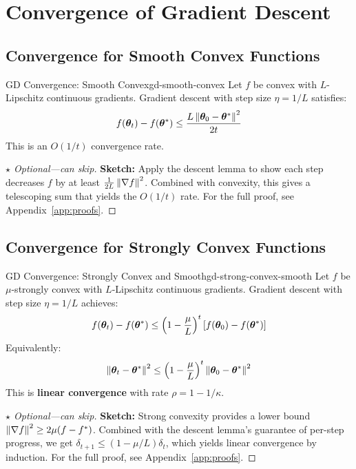 \documentclass[../../main.tex]{subfiles}
\begin{document}
\section{Convergence of Gradient Descent}
\label{sec:gd-convergence}

\subsection{Convergence for Smooth Convex Functions}

\begin{theorem}{GD Convergence: Smooth Convex}{gd-smooth-convex}
Let $f$ be convex with $L$-Lipschitz continuous gradients. Gradient descent with step size $\eta = 1/L$ satisfies:
\[
    f(\boldsymbol{\theta}_t) - f(\boldsymbol{\theta}^*) \leq \frac{L \left\lVert \boldsymbol{\theta}_0 - \boldsymbol{\theta}^* \right\rVert^2}{2t}
\]
This is an $O(1/t)$ convergence rate.
\end{theorem}

\begin{proof}[$\star$ Optional---can skip]
\textbf{Sketch:} Apply the descent lemma to show each step decreases $f$ by at least $\frac{1}{2L}\left\lVert \nabla f \right\rVert^2$. Combined with convexity, this gives a telescoping sum that yields the $O(1/t)$ rate. For the full proof, see Appendix~\ref{app:proofs}.
\end{proof}

\subsection{Convergence for Strongly Convex Functions}

\begin{theorem}{GD Convergence: Strongly Convex and Smooth}{gd-strong-convex-smooth}
Let $f$ be $\mu$-strongly convex with $L$-Lipschitz continuous gradients. Gradient descent with step size $\eta = 1/L$ achieves:
\[
    f(\boldsymbol{\theta}_t) - f(\boldsymbol{\theta}^*) \leq \left(1 - \frac{\mu}{L}\right)^t [f(\boldsymbol{\theta}_0) - f(\boldsymbol{\theta}^*)]
\]
Equivalently:
\[
    \left\lVert \boldsymbol{\theta}_t - \boldsymbol{\theta}^* \right\rVert^2 \leq \left(1 - \frac{\mu}{L}\right)^t \left\lVert \boldsymbol{\theta}_0 - \boldsymbol{\theta}^* \right\rVert^2
\]
This is \textbf{linear convergence} with rate $\rho = 1 - 1/\kappa$.
\end{theorem}

\begin{proof}[$\star$ Optional---can skip]
\textbf{Sketch:} Strong convexity provides a lower bound $\left\lVert \nabla f \right\rVert^2 \geq 2\mu(f - f^*)$. Combined with the descent lemma's guarantee of per-step progress, we get $\delta_{t+1} \leq (1 - \mu/L)\delta_t$, which yields linear convergence by induction. For the full proof, see Appendix~\ref{app:proofs}.
\end{proof}
\end{document}
